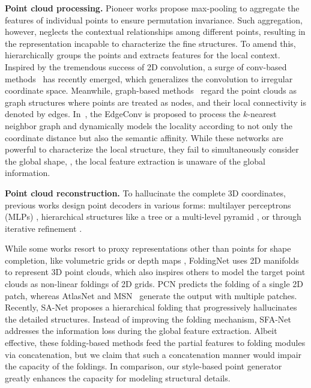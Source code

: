 \documentclass[final]{cvpr}
\begin{document}
\noindent\textbf{Point cloud processing.}
Pioneer works \cite{qi2017pointnet,zaheer2017deep} propose max-pooling to aggregate the features of individual points to ensure permutation invariance. Such aggregation, however, neglects the contextual relationships among different points, resulting in the representation incapable to characterize the fine structures. To amend this, \cite{qi2017pointnet++} hierarchically groups the points and extracts features for the local context. Inspired by the tremendous success of 2D convolution, a surge of conv-based methods~\cite{hua2018pointwise,xu2018spidercnn,groh2018flex,atzmon2018point,li2018pointcnn,thomas2019kpconv,dgcnn} has recently emerged, which generalizes the convolution to irregular coordinate space. Meanwhile, graph-based methods~\cite{dgcnn,wang2018local} regard the point clouds as graph structures where points are treated as nodes, and their local connectivity is denoted by edges. In~\cite{dgcnn}, the EdgeConv is proposed to process the $k$-nearest neighbor graph and dynamically models the locality according to not only the coordinate distance but also the semantic affinity. While these networks are powerful to characterize the local structure, they fail to simultaneously consider the global shape, \ie, the local feature extraction is unaware of the global information.

\noindent\textbf{Point cloud reconstruction.}
To hallucinate the complete 3D coordinates, previous works design point decoders in various forms: multilayer perceptrons (MLPs) \cite{chen2019unpaired}, hierarchical structures like a tree \cite{topnet_2019_CVPR} or a multi-level pyramid \cite{pfnet_2020_CVPR}, or through iterative refinement \cite{cascaded_2020_CVPR}.



While some works resort to proxy representations other than points for shape completion, like volumetric grids \cite{dai2017shape,xie2020grnet} or depth maps \cite{hu2019render4completion}, FoldingNet \cite{foldingnet_2018_CVPR} uses 2D manifolds to represent 3D point clouds, which also inspires others to model the target point clouds as non-linear foldings of 2D grids. 
PCN \cite{Yuan-2018-pcn} predicts the folding of a single 2D patch, whereas AtlasNet \cite{atlasnet2018} and MSN~\cite{liu2019morphing} generate the output with multiple patches. Recently, SA-Net \cite{wen2020point} proposes a hierarchical folding that progressively hallucinates the detailed structures. Instead of improving the folding mechanism, SFA-Net~\cite{detailpreserved_eccv2020} addresses the information loss during the global feature extraction. Albeit effective, these folding-based methods feed the partial features to folding modules via concatenation, but we claim that such a concatenation manner would impair the capacity of the foldings. In comparison, our style-based point generator greatly enhances the capacity for modeling structural details.
\end{document}
